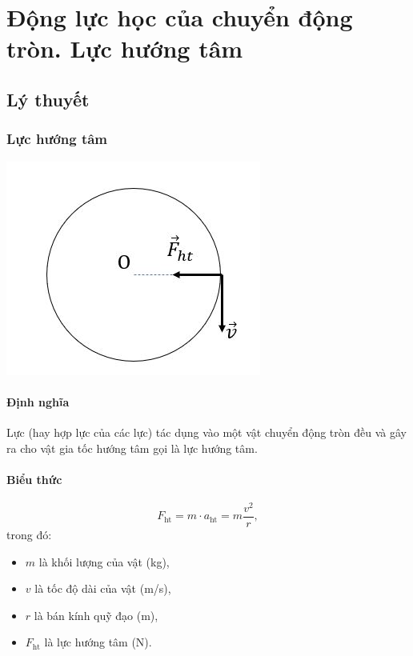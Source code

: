 \let\lesson\undefined
\newcommand{\lesson}{\phantomlesson{Bài 22: Động lực học của chuyển động tròn. Lực hướng tâm}}
\chapter[Động lực học của chuyển động tròn. Lực hướng tâm]{Động lực học của chuyển động tròn. Lực hướng tâm}
\setcounter{section}{0}
\section{Lý thuyết}
\subsection{Lực hướng tâm}
\begin{center}
	\includegraphics[scale=0.6]{../figs/VN10-PH-16-L-013-1-V2-04.JPG}
\end{center}
\subsubsection{Định nghĩa}
Lực (hay hợp lực của các lực) tác dụng vào một vật chuyển động tròn đều và gây ra cho vật gia tốc hướng tâm gọi là lực hướng tâm.
\subsubsection{Biểu thức}

\begin{equation*}
	F_{\text{ht}} = m \cdot a_{\text{ht}} = m\dfrac{v^2}{r},
\end{equation*}
trong đó:
\begin{itemize}
	\item $m$ là khối lượng của vật (kg), 
	\item $v$ là tốc độ dài của vật (m/s),
	\item $r$ là bán kính quỹ đạo (m),
	\item $F_{\text{ht}}$ là lực hướng tâm (N).
\end{itemize}
